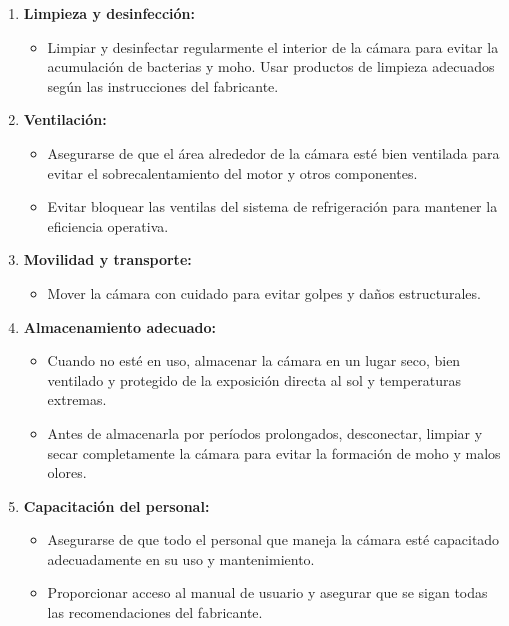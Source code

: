 \begin{enumerate}
  	\item \textbf{Limpieza y desinfección:}
  	\begin{itemize}
  		\item Limpiar y desinfectar regularmente el interior de la cámara para evitar la acumulación de bacterias y moho. Usar productos de limpieza adecuados según las instrucciones del fabricante.
  	\end{itemize}
  	
  	\item \textbf{Ventilación:}
  	\begin{itemize}
  		\item Asegurarse de que el área alrededor de la cámara esté bien ventilada para evitar el sobrecalentamiento del motor y otros componentes.
  		\item Evitar bloquear las ventilas del sistema de refrigeración para mantener la eficiencia operativa.
  	\end{itemize}
  	
  	\item \textbf{Movilidad y transporte:}
  	\begin{itemize}
  		\item Mover la cámara con cuidado para evitar golpes y daños estructurales.
  	\end{itemize}
  	
  	\item \textbf{Almacenamiento adecuado:}
  	\begin{itemize}
  		\item Cuando no esté en uso, almacenar la cámara en un lugar seco, bien ventilado y protegido de la exposición directa al sol y temperaturas extremas.
  		\item Antes de almacenarla por períodos prolongados, desconectar, limpiar y secar completamente la cámara para evitar la formación de moho y malos olores.
  	\end{itemize}
  	
  	\item \textbf{Capacitación del personal:}
  	\begin{itemize}
  		\item Asegurarse de que todo el personal que maneja la cámara esté capacitado adecuadamente en su uso y mantenimiento.
  		\item Proporcionar acceso al manual de usuario y asegurar que se sigan todas las recomendaciones del fabricante.
  	\end{itemize}
  \end{enumerate}
  
  
  